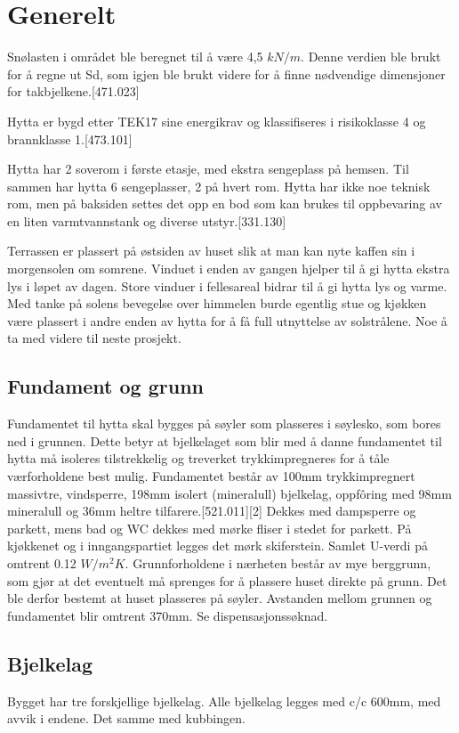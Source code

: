 \documentclass[12pt]{article}
\begin{document}
\pagebreak
\section{Generelt}
Snølasten i området ble beregnet til å være 4,5 $kN/m$. Denne verdien ble brukt for å regne ut Sd, som igjen ble brukt videre for å finne nødvendige dimensjoner for takbjelkene.[471.023]

Hytta er bygd etter TEK17 sine energikrav og klassifiseres i risikoklasse 4 og brannklasse 1.[473.101]

Hytta har 2 soverom i første etasje, med ekstra sengeplass på hemsen. Til sammen har hytta 6 sengeplasser, 2 på hvert rom. Hytta har ikke noe teknisk rom, men på baksiden settes det opp en bod som kan brukes til oppbevaring av en liten varmtvannstank og diverse utstyr.[331.130]

Terrassen er plassert på østsiden av huset slik at man kan nyte kaffen sin i morgensolen om somrene. Vinduet i enden av gangen hjelper til å gi hytta ekstra lys i løpet av dagen. Store vinduer i fellesareal bidrar til å gi hytta lys og varme. Med tanke på solens bevegelse over himmelen burde egentlig stue og kjøkken være plassert i andre enden av hytta for å få full utnyttelse av solstrålene. Noe å ta med videre til neste prosjekt.




\subsection{Fundament og grunn}
Fundamentet til hytta skal bygges på søyler som plasseres i søylesko, som bores ned i grunnen. Dette betyr at bjelkelaget som blir med å danne fundamentet til hytta
må isoleres tilstrekkelig og treverket trykkimpregneres for å tåle værforholdene
best mulig.
Fundamentet består av 100mm trykkimpregnert massivtre, vindsperre, 198mm isolert (mineralull) bjelkelag, oppfôring med 98mm mineralull og 36mm heltre tilfarere.[521.011][2]
Dekkes med dampsperre og parkett, mens bad og WC dekkes med mørke fliser i stedet for parkett. På kjøkkenet og i inngangspartiet legges det mørk skiferstein.
Samlet U-verdi på omtrent 0.12 $W/m^2K$.
Grunnforholdene i nærheten består av mye berggrunn, som gjør at det eventuelt må sprenges for å plassere huset direkte på grunn. Det ble derfor bestemt at huset plasseres på søyler. Avstanden mellom grunnen og fundamentet blir omtrent 370mm. Se dispensasjonssøknad.

\subsection{Bjelkelag}
Bygget har tre forskjellige bjelkelag. Alle bjelkelag legges med c/c 600mm, med avvik i endene. Det samme med kubbingen.
\end{document}
